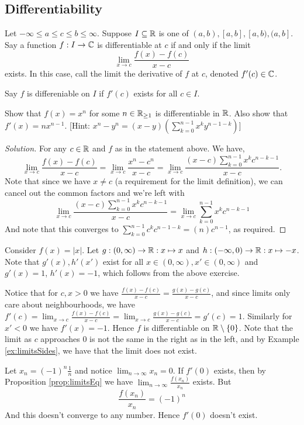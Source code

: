 \subsection{Differentiability}
\begin{definition}
  Let $-\infty\leq a\leq c \leq b \leq \infty$. Suppose $I\subseteq\mathbb R$ is one of
  $(a,b),[a,b],[a,b),(a,b]$. Say a function $f:I\to\mathbb C$ is differentiable at $c$ if and
  only if the limit
  \[\lim_{x\to c} \frac{f(x)-f(c)}{x-c}\]
  exists. In this case, call the limit the derivative of $f$ at $c$, denoted
  $f'(c)\in\mathbb C$. 

  Say $f$ is differeniable on $I$ if $f'(c)$ exists for all $c\in I$.
  \label{def:differentiability}
\end{definition}

\begin{exercise}
  Show that $f(x)=x^n$ for some $n\in\mathbb R_{\geq 1}$ is differentiable in $\mathbb R$.  Also show
  that $f'(x)=nx^{n-1}$.
  [Hint: $x^n-y^n = (x-y)(\sum_{k=0}^{n-1} x^ky^{n-1-k})$]
\end{exercise}
\begin{proof}[Solution]
  For any $c\in\mathbb R$ and $f$ as in the statement above. We have,
  \[\lim_{x\to c} \frac{f(x)-f(c)}{x-c}= \lim_{x\to c} \frac{x^n - c^n}{x-c} =
  \lim_{x\to c} \frac{(x-c)\sum_{k=0}^{n-1}x^kc^{n-k-1}}{x-c}.\]
  Note that since we have $x\neq c$ (a requirement for the limit definition), we can
  cancel out the common factors and we're left with
  \[\lim_{x\to c} \frac{(x-c)\sum_{k=0}^{n-1}x^kc^{n-k-1}}{x-c} = \lim_{x\to
  c}\sum_{k=0}^{n-1}x^kc^{n-k-1}\]
  And note that this converges to $\sum_{k=0}^{n-1}c^k c^{n-1-k}= (n)c^{n-1}$, as
  required.
\end{proof}

\begin{example}
  Consider $f(x)=|x|$. Let $g:(0,\infty)\to\mathbb R:x\mapsto x$ and
  $h:(-\infty,0)\to\mathbb R:x\mapsto -x$. Note that $g'(x),h'(x')$ exist for all
  $x\in(0,\infty),x'\in(0,\infty)$ and $g'(x)=1$, $h'(x)=-1$, which follows from the above
  exercise.

  Notice that for $c,x>0$ we have $\frac{f(x)-f(c)}{x-c}=\frac{g(x)-g(c)}{x-c}$, and since
  limits only care about neighbourhoods, we have $f'(c)=\lim_{x\to
  c}\frac{f(x)-f(c)}{x-c}= \lim_{x\to c}\frac{g(x)-g(c)}{x-c} = g'(c)=1$. Similarly for
  $x'<0$ we have $f'(x)=-1$. Hence $f$ is differentiable on $\mathbb R\setminus\{0\}$. Note that
  the limit as $c$ approaches $0$ is not the same in the right as in the left, and by
  Example \ref{ex:limitsSides}, we have that the limit does not exist.

  Let $x_n=(-1)^n\frac{1}{n}$ and notice $\lim_{n\to \infty}x_n=0$. If $f'(0)$ exists,
  then by Proposition \ref{prop:limitsEq} we have $\lim_{n\to \infty}
  \frac{f(x_n)}{x_n}$ exists. But 
  \[\frac{f(x_n)}{x_n} = (-1)^n\]
  And this doesn't converge to any number. Hence $f'(0)$ doesn't exist.
  \label{ex:absoluteLimits}
\end{example}


